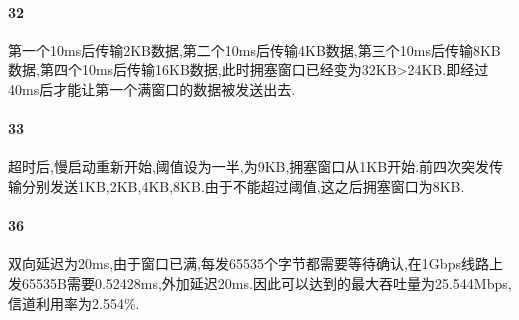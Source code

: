 \documentclass[a4paper]{article}
\begin{document}
\paragraph{32}
第一个10ms后传输2KB数据,第二个10ms后传输4KB数据,第三个10ms后传输8KB数据,第四个10ms后传输16KB数据,此时拥塞窗口已经变为32KB>24KB.即经过40ms后才能让第一个满窗口的数据被发送出去.
\paragraph{33}
超时后,慢启动重新开始,阈值设为一半,为9KB,拥塞窗口从1KB开始.前四次突发传输分别发送1KB,2KB,4KB,8KB.由于不能超过阈值,这之后拥塞窗口为8KB.
\paragraph{36}
双向延迟为20ms,由于窗口已满,每发65535个字节都需要等待确认,在1Gbps线路上发65535B需要0.52428ms,外加延迟20ms.因此可以达到的最大吞吐量为25.544Mbps,信道利用率为2.554\%.
\end{document}
